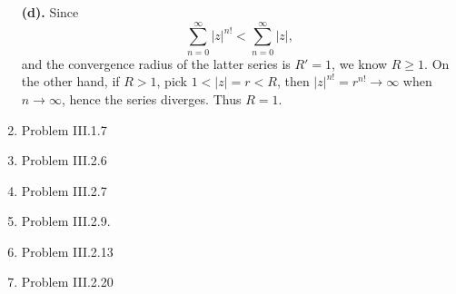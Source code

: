 \documentclass{article}%
\begin{document}
\begin{enumerate}
\textbf{(d).} Since 
$$
\sum_{n=0}^{\infty}|z|^{n!} < \sum_{n=0}^{\infty}|z|,
$$
and the convergence radius of the latter series is $R' = 1$, we know $R\ge 1$. On the other hand, if $R > 1$, pick $1 < |z| = r < R$, then $|z|^{n!} = r^{n!}\to\infty $ when $n\to\infty$, hence the series diverges. Thus $R = 1$.

\item Problem III.1.7

\item Problem III.2.6

\item Problem III.2.7

\item Problem III.2.9.

\item Problem III.2.13

\item Problem III.2.20

\end{enumerate}
\end{document}
